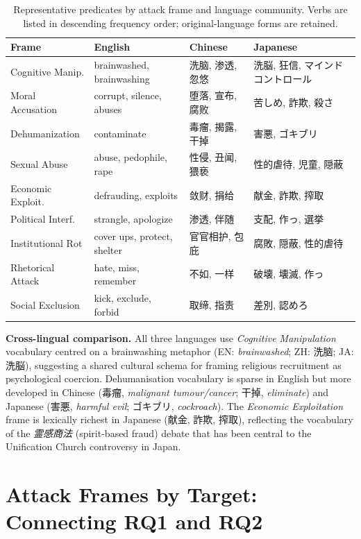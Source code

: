 \documentclass[../CLthesis.tex]{subfiles}
\begin{document}
\begin{table}[htbp]
\centering
\caption{Representative predicates by attack frame and language community. Verbs are listed in descending frequency order; original-language forms are retained.}
\label{tab:rq2-top-verbs}
\small
\begin{tabular}{lp{3.5cm}p{3.5cm}p{3.5cm}}
\hline
\textbf{Frame} & \textbf{English} & \textbf{Chinese} & \textbf{Japanese} \\
\hline
Cognitive Manip. & brainwashed, brainwashing & 洗脑, 渗透, 忽悠 & 洗脳, 狂信, マインドコントロール \\
Moral Accusation & corrupt, silence, abuses & 堕落, 宣布, 腐败 & 苦しめ, 詐欺, 殺さ \\
Dehumanization & contaminate & 毒瘤, 揭露, 干掉 & 害悪, ゴキブリ \\
Sexual Abuse & abuse, pedophile, rape & 性侵, 丑闻, 猥亵 & 性的虐待, 児童, 隠蔽 \\
Economic Exploit. & defrauding, exploits & 敛财, 捐给 & 献金, 詐欺, 搾取 \\
Political Interf. & strangle, apologize & 渗透, 伴随 & 支配, 作っ, 選挙 \\
Institutional Rot & cover ups, protect, shelter & 官官相护, 包庇 & 腐敗, 隠蔽, 性的虐待 \\
Rhetorical Attack & hate, miss, remember & 不如, 一样 & 破壊, 壊滅, 作っ \\
Social Exclusion & kick, exclude, forbid & 取缔, 指责 & 差別, 認めろ \\
\hline
\end{tabular}
\end{table}

\textbf{Cross-lingual comparison.}
All three languages use \textit{Cognitive Manipulation} vocabulary centred on a brainwashing metaphor (EN: \textit{brainwashed}; ZH: 洗脑; JA: 洗脳), suggesting a shared cultural schema for framing religious recruitment as psychological coercion. Dehumanisation vocabulary is sparse in English but more developed in Chinese (毒瘤, \textit{malignant tumour/cancer}; 干掉, \textit{eliminate}) and Japanese (害悪, \textit{harmful evil}; ゴキブリ, \textit{cockroach}). The \textit{Economic Exploitation} frame is lexically richest in Japanese (献金, 詐欺, 搾取), reflecting the vocabulary of the \textit{霊感商法} (spirit-based fraud) debate that has been central to the Unification Church controversy in Japan.

\section{Attack Frames by Target: Connecting RQ1 and RQ2}
\label{sec:rq2-by-target}
\end{document}
